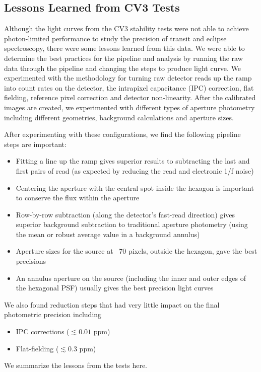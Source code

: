 \documentclass{aastex62}
\begin{document}
\subsection{Lessons Learned from CV3 Tests}\label{sec:CV3Lessons}
Although the light curves from the CV3 stability tests were not able to achieve photon-limited performance to study the precision of transit and eclipse spectroscopy, there were some lessons learned from this data.
We were able to determine the best practices for the pipeline and analysis by running the raw data through the pipeline and changing the steps to produce light curve.
We experimented with the methodology for turning raw detector reads up the ramp into count rates on the detector, the intrapixel capacitance (IPC) correction, flat fielding, reference pixel correction and detector non-linearity.
After the calibrated images are created, we experimented with different types of aperture photometry including different geometries, background calculations and aperture sizes.

After experimenting with these configurations, we find the following pipeline steps are important:
\begin{itemize}
	\item Fitting a line up the ramp gives superior results to subtracting the last and first pairs of read (as expected by reducing the read and electronic 1/f noise)
	\item Centering the aperture with the central spot inside the hexagon is important to conserve the flux within the aperture
	\item Row-by-row subtraction (along the detector's fast-read direction) gives superior background subtraction to traditional aperture photometry (using the mean or robust average value in a background annulus)
	\item Aperture sizes for the source at ~70 pixels, outside the hexagon, gave the best precisions
	\item An annulus aperture on the source (including the inner and outer edges of the hexagonal PSF) usually gives the best precision light curves
\end{itemize}

We also found reduction steps that had very little impact on the final photometric precision including
\begin{itemize}
	\item IPC corrections ($\lesssim 0.01$ ppm)
	\item Flat-fielding ($\lesssim 0.3$ ppm)
\end{itemize}
We summarize the lessons from the tests here.
\end{document}
